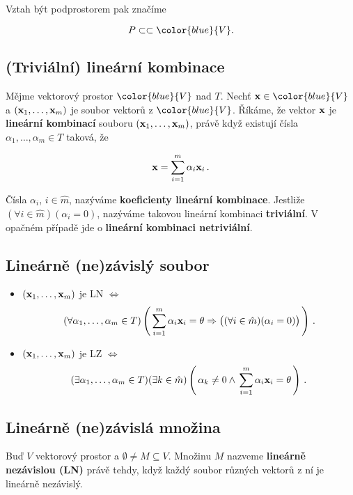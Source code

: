 Vztah být podprostorem pak značíme

\[ P\subset \subset \color{blue}{V}. \]

\subsection*{(Triviální) lineární kombinace}

Mějme vektorový prostor $\color{blue}{V}$ nad $T$. Nechť $\vx\in
      \color{blue}{V}$ a $(\mathbf{x}_{1},\dots,\mathbf{x}_{m})$ je soubor vektorů z
$\color{blue}{V}$. Říkáme, že vektor $\mathbf{x}$ je \textbf{lineární kombinací}
souboru $(\mathbf{x}_{1},\dots,\mathbf{x}_{m})$, právě když existují čísla
$\alpha_{1},\dots,\alpha_{m}\in T$ taková, že

\[ \mathbf{x}=\sum_{i=1}^{m}\alpha_{i}\mathbf{x}_{i}\,. \]

Čísla $\alpha_{i}$, $i\in\hat{m}$, nazýváme \textbf{koeficienty lineární kombinace}.
Jestliže $(\forall i\in\hat{m})(\alpha_{i}=0)$, nazýváme takovou lineární kombinaci \textbf{triviální}.
V opačném případě jde o \textbf{lineární kombinaci netriviální}.

\subsection*{Lineárně (ne)závislý soubor}

\begin{itemize}
      \item $(\mathbf{x}_{1},\dots,\mathbf{x}_{m})$ je LN $\Leftrightarrow$
            \[ (\forall \alpha_{1},\dots,\alpha_{m}\in T)\left(\,\sum_{i=1}^{m}\alpha_{i}\mathbf{x}_{i}=\theta \Rightarrow \big((\forall i\in\hat{m})(\alpha_{i}=0)\big)\,\right)\,. \]
      \item $(\mathbf{x}_{1},\dots,\mathbf{x}_{m})$ je LZ $\Leftrightarrow$
            \[ (\exists \alpha_{1},\dots,\alpha_{m}\in T) (\exists k\in\hat{m})
                  \left(\,\alpha_{k}\neq0 \wedge \,\sum_{i=1}^{m}\alpha_{i}\mathbf{x}_{i}=\theta\,\right)\,.
            \]
\end{itemize}

\subsection*{Lineárně (ne)závislá množina}

Buď $V$ vektorový prostor a $\emptyset\neq M\subseteq V$. Množinu $M$ nazveme \textbf{lineárně nezávislou (LN)} právě tehdy, když každý soubor různých vektorů z ní je lineárně nezávislý.

\vspace{0.5em}

